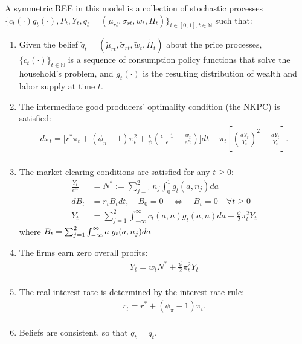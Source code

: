 \documentclass[notitlepage,a4paper,11pt]{report}
\numberwithin{section}{chapter}
\numberwithin{subsection}{section}
\begin{document}
A symmetric REE in this model is a collection of stochastic processes $\{ c_t(\cdot) g_t(\cdot), P_t, Y_t, q_t = (\mu_{rt}, \sigma_{rt}, w_t, \Pi_t) \}_{i \in [0,1], t \in \mathbb{N}}$ such that: 
\begin{enumerate}[label=\arabic*)]
\item Given the belief $\tilde{q}_t = (\tilde{\mu}_{rt}, \tilde{\sigma}_{rt}, \tilde{w}_t, \tilde{\Pi}_t)$ about the price processes, $\{c_t(\cdot ) \}_{t \in \mathbb{N}}$ is a sequence of consumption policy functions that solve the household's problem, and $g_t(\cdot)$ is the resulting distribution of wealth and labor supply at time $t$. \\


\item The intermediate good producers' optimality condition (the NKPC) is satisfied: 
\begin{align*}
d \pi_t = \Bigg[ r^* \pi_t + (\phi_{\pi} -1)\pi_t^2 +  \frac{\epsilon}{\psi} \left( \frac{\epsilon-1}{\epsilon} - \frac{w_t}{e^{z_t}} \right) \Bigg] dt + \pi_t \left[ \left( \frac{dY_t}{Y_t} \right)^2 - \frac{dY_t}{Y_t} \right]. \\
\end{align*}



\item The market clearing conditions are satisfied for any $t \geq 0$: 
\begin{align*}
 \frac{Y_t}{e^{z_t}} &  = N^* := \sum_{j=1}^2 n_j \int_0^1 g_t(a,n_j) da \tag{Labor Market} \\[10pt]
 dB_t & =r_t B_t dt, \quad B_0 = 0 \quad \Leftrightarrow \quad B_t = 0 \quad \forall t \geq 0  \tag{Bond Market}  \\[10pt]
Y_t & = \sum_{j=1}^2 \int_{-\infty}^{\infty} c_t(a,n) g_t(a,n) da + \frac{\psi}{2} \pi_t^2 Y_t  \tag{Goods Market}
\end{align*}
where $B_t = \sum_{j=1}^2 \int_{-\infty}^{\infty} a \hspace{0.1cm} g_t(a,n_j) da$ \\[10pt]



\item The firms earn zero overall profits: 
\begin{align*}
    Y_t = w_t N^* + \frac{\psi}{2} \pi_t^2 Y_t \\
\end{align*}


\item The real interest rate is determined by the interest rate rule: 
\begin{align*}
r_t = r^* + (\phi_{\pi} -1 ) \pi_t. \\
\end{align*}


\item Beliefs are consistent, so that $\tilde{q}_t = q_t$. \\

\end{enumerate}
\end{document}
